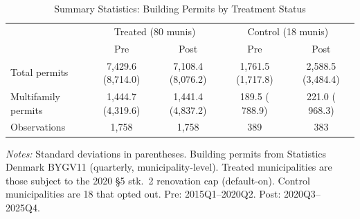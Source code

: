 \begin{table}[htbp]
\centering
\caption{Summary Statistics: Building Permits by Treatment Status}
\label{tab:summary}
\begin{threeparttable}
\small
\begin{tabular}{lcccc}
\hline\hline
 & \multicolumn{2}{c}{Treated (80 munis)} & \multicolumn{2}{c}{Control (18 munis)} \\
 & Pre & Post & Pre & Post \\
\hline
Total permits & 7,429.6 (8,714.0) & 7,108.4 (8,076.2) & 1,761.5 (1,717.8) & 2,588.5 (3,484.4) \\
Multifamily permits & 1,444.7 (4,319.6) & 1,441.4 (4,837.2) &   189.5 (  788.9) &   221.0 (  968.3) \\
Observations & 1,758 & 1,758 &   389 &   383 \\
\hline\hline
\end{tabular}
\begin{tablenotes}[flushleft]\small
\item \textit{Notes:} Standard deviations in parentheses. Building permits from Statistics Denmark BYGV11 (quarterly, municipality-level). Treated municipalities are those subject to the 2020 \S5 stk.\ 2 renovation cap (default-on). Control municipalities are 18 that opted out. Pre: 2015Q1--2020Q2. Post: 2020Q3--2025Q4.
\end{tablenotes}
\end{threeparttable}
\end{table}

